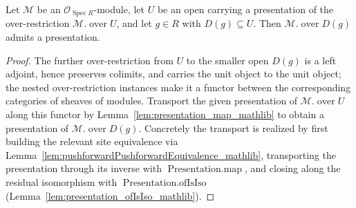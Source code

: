 \begin{lemma}\leanok
  \label{lem:presentation_over_basicOpen}
  Let \(\mathcal{M}\) be an \(\mathcal{O}_{\operatorname{Spec} R}\)-module, let \(U\) be an open
  carrying a presentation of the over-restriction \(\mathcal{M}.\operatorname{over} U\), and let
  \(g \in R\) with \(D(g) \subseteq U\). Then \(\mathcal{M}.\operatorname{over} D(g)\) admits a
  presentation.
\end{lemma}
\begin{proof}
  \leanok
  The further over-restriction from \(U\) to the smaller open \(D(g)\) is a left adjoint, hence
  preserves colimits, and carries the unit object to the unit object; the nested over-restriction
  instances make it a functor between the corresponding categories of sheaves of modules. Transport the
  given presentation of \(\mathcal{M}.\operatorname{over} U\) along this functor by
  Lemma~\ref{lem:presentation_map_mathlib} to obtain a presentation of
  \(\mathcal{M}.\operatorname{over} D(g)\). Concretely the transport is realized by first building the
  relevant site equivalence via Lemma~\ref{lem:pushforwardPushforwardEquivalence_mathlib}, transporting
  the presentation through its inverse with \(\operatorname{Presentation.map}\), and closing along the
  residual isomorphism with \(\operatorname{Presentation.ofIsIso}\)
  (Lemma~\ref{lem:presentation_ofIsIso_mathlib}).
\end{proof}

